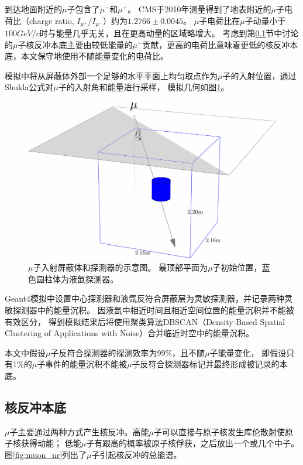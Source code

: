 到达地面附近的$\mu$子包含了$\mu^-$和$\mu^+$。
CMS于2010年测量得到了地表附近的$\mu$子电荷比（charge ratio, $I_{\mu^+}/I_{\mu^-}$）约为$1.2766\pm0.0045$\cite{the_cms_collaboration_measurement_2010}。
$\mu$子电荷比在$\mu$子动量小于$100\si{GeV/c}$时与能量几乎无关，且在更高动量的区域略增大。
考虑到第\ref{sec:muon_nr}节中讨论的$\mu$子核反冲本底主要由较低能量的$\mu^-$贡献，更高的电荷比意味着更低的核反冲本底，本文保守地使用不随能量变化的电荷比。

模拟中将从屏蔽体外部一个足够的水平平面上均匀取点作为$\mu$子的入射位置，通过Shukla公式对$\mu$子的入射角和能量进行采样，
模拟几何如图\ref{fig:muon_inject}。

\begin{figure}
  \centering
  \includegraphics[width=0.6\linewidth]{figures/muon_inject.pdf}
  \caption{\label{fig:muon_inject} $\mu$子入射屏蔽体和探测器的示意图。
  最顶部平面为$\mu$子初始位置，蓝色圆柱体为液氙探测器。}
\end{figure}

Geant4模拟中设置中心探测器和液氙反符合屏蔽层为灵敏探测器，并记录两种灵敏探测器中的能量沉积。
因液氙中相近时间且相近空间位置的能量沉积并不能被有效区分，
得到模拟结果后将使用聚类算法DBSCAN（Density-Based Spatial Clustering of Applications with Noise）\cite{ester_density-based_1996,schubert_dbscan_2017}合并临近时空中的能量沉积。

本文中假设$\mu$子反符合探测器的探测效率为99\%，且不随$\mu$子能量变化，
即假设只有1\%的$\mu$子事件的能量沉积不能被$\mu$子反符合探测器标记并最终形成被记录的本底。

\subsection{核反冲本底}
\label{sec:muon_nr}

$\mu$子主要通过两种方式产生核反冲。高能$\mu$子可以直接与原子核发生库伦散射使原子核获得动能；
低能$\mu$子有跟高的概率被原子核俘获，之后放出一个或几个中子。图\ref{fig:muon_nr}列出了$\mu$子引起核反冲的总能谱。

